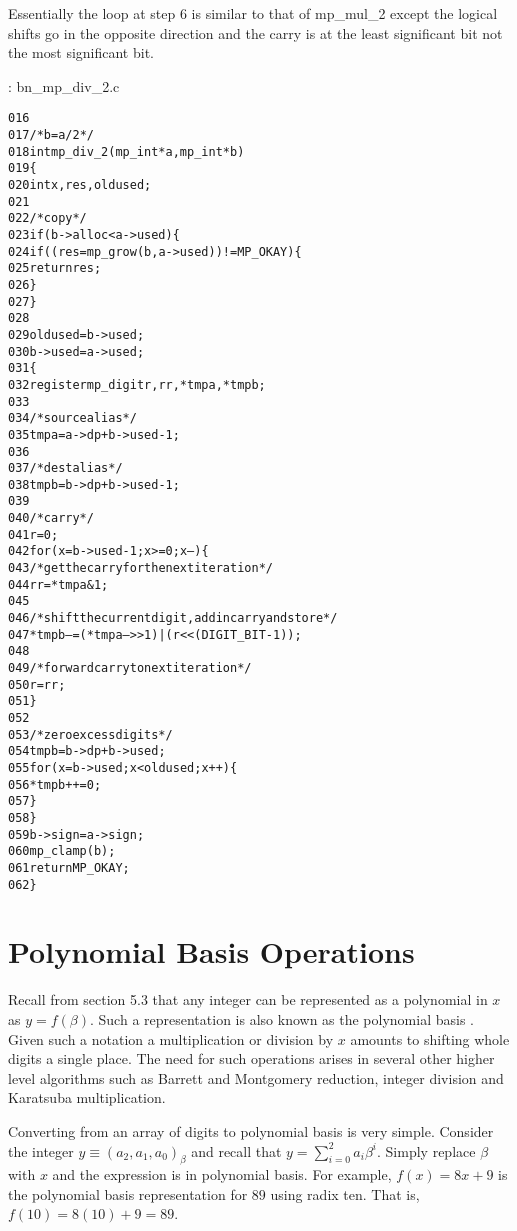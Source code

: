 \documentclass[b5paper]{book}
\begin{document}
Essentially the loop at step 6 is similar to that of mp\_mul\_2 except the logical shifts go in the opposite direction and the carry is at the 
least significant bit not the most significant bit.  

\vspace{+3mm}\begin{small}
\hspace{-5.1mm}{\bf File}: bn\_mp\_div\_2.c
\vspace{-3mm}
\begin{alltt}
016   
017   /* b = a/2 */
018   int mp_div_2(mp_int * a, mp_int * b)
019   \{
020     int     x, res, oldused;
021   
022     /* copy */
023     if (b->alloc < a->used) \{
024       if ((res = mp_grow (b, a->used)) != MP_OKAY) \{
025         return res;
026       \}
027     \}
028   
029     oldused = b->used;
030     b->used = a->used;
031     \{
032       register mp_digit r, rr, *tmpa, *tmpb;
033   
034       /* source alias */
035       tmpa = a->dp + b->used - 1;
036   
037       /* dest alias */
038       tmpb = b->dp + b->used - 1;
039   
040       /* carry */
041       r = 0;
042       for (x = b->used - 1; x >= 0; x--) \{
043         /* get the carry for the next iteration */
044         rr = *tmpa & 1;
045   
046         /* shift the current digit, add in carry and store */
047         *tmpb-- = (*tmpa-- >> 1) | (r << (DIGIT_BIT - 1));
048   
049         /* forward carry to next iteration */
050         r = rr;
051       \}
052   
053       /* zero excess digits */
054       tmpb = b->dp + b->used;
055       for (x = b->used; x < oldused; x++) \{
056         *tmpb++ = 0;
057       \}
058     \}
059     b->sign = a->sign;
060     mp_clamp (b);
061     return MP_OKAY;
062   \}
\end{alltt}
\end{small}

\section{Polynomial Basis Operations}
Recall from section 5.3 that any integer can be represented as a polynomial in $x$ as $y = f(\beta)$.  Such a representation is also known as
the polynomial basis \cite[pp. 48]{ROSE}. Given such a notation a multiplication or division by $x$ amounts to shifting whole digits a single 
place.  The need for such operations arises in several other higher level algorithms such as Barrett and Montgomery reduction, integer
division and Karatsuba multiplication.  

Converting from an array of digits to polynomial basis is very simple.  Consider the integer $y \equiv (a_2, a_1, a_0)_{\beta}$ and recall that
$y = \sum_{i=0}^{2} a_i \beta^i$.  Simply replace $\beta$ with $x$ and the expression is in polynomial basis.  For example, $f(x) = 8x + 9$ is the
polynomial basis representation for $89$ using radix ten.  That is, $f(10) = 8(10) + 9 = 89$.  
\end{document}
